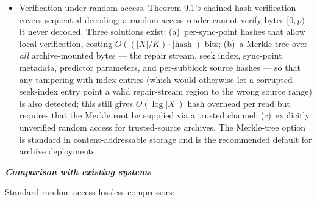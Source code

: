 \documentclass[
]{article}
\begin{document}
\begin{itemize}
  beyond their containing token's split). Over $|X|/K$ sync points
  the worst-case loss is bounded by $8 \cdot |X| \cdot
  \overline{|\tau|_{\text{crossed}}} / K$ bits, where
  $\overline{|\tau|_{\text{crossed}}}$ is the average length of
  crossed tokens (bounded above by $\max_\tau |\tau|$). For
  $K \gg \max_\tau |\tau|$ this is negligible; for $K$ comparable to
  $\max_\tau |\tau|$ the worst-case fractional overhead approaches
  $8 \cdot \max_\tau|\tau| / K$ bits per source byte, which can be
  substantial. Specifically, $K = 4$ KiB and a worst-case
  $\max_\tau|\tau| = 1$ KiB give a worst-case overhead bound of
  $2$ bits per source byte (25\% of an 8 bits/byte raw source);
  in practice the average crossed token is shorter than the maximum,
  and the typical overhead is a few per-cent on natural data. A
  non-uniform sync-point variant that aligns boundaries to token
  edges instead is also available, at the cost of storing byte
  offsets in the seek index (Definition 10.3's non-uniform spacing
  case, adding $\lceil \log_2 |X|\rceil$ bits per entry); the
  random-access cost then follows the non-uniform branch of
  Theorem 10.3 ($O(\log(|X|/K) \cdot (\log |X| + \log L(R)))$
  binary-search bits, including the per-entry source-position
  width).
\item
  Verification under random access. Theorem 9.1's chained-hash
  verification covers sequential decoding; a random-access reader
  cannot verify bytes $[0, p)$ it never decoded. Three solutions
  exist: (a)~per-sync-point hashes that allow local verification,
  costing $O((|X|/K) \cdot |\text{hash}|)$ bits; (b)~a Merkle tree
  over \emph{all} archive-mounted bytes --- the repair stream,
  seek index, sync-point metadata, predictor parameters, and
  per-subblock source hashes --- so that any tampering with index
  entries (which would otherwise let a corrupted seek-index entry
  point a valid repair-stream region to the wrong source range)
  is also detected; this still gives $O(\log |X|)$ hash overhead
  per read but requires that the Merkle root be supplied via a
  trusted channel; (c)~explicitly unverified random access for
  trusted-source archives. The Merkle-tree option is standard in
  content-addressable storage and is the recommended default for
  archive deployments.
\end{itemize}

\emph{\textbf{Comparison with existing systems}}

Standard random-access lossless compressors:
\end{document}
